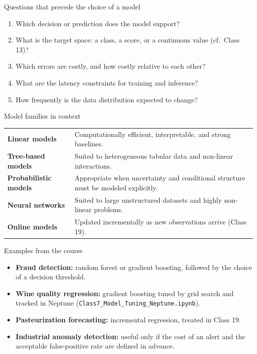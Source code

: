 \begin{frame}{Questions that precede the choice of a model}
\begin{enumerate}
\item Which decision or prediction does the model support?
\item What is the target space: a class, a score, or a continuous value (cf.\ Class 13)?
\item Which errors are costly, and how costly relative to each other?
\item What are the latency constraints for training and inference?
\item How frequently is the data distribution expected to change?
\end{enumerate}
\coursefooter
\end{frame}

\begin{frame}{Model families in context}
\begin{tabularx}{\textwidth}{>{\bfseries}l X}
Linear models & Computationally efficient, interpretable, and strong baselines. \\
\addlinespace[0.3em]
Tree-based models & Suited to heterogeneous tabular data and non-linear interactions. \\
\addlinespace[0.3em]
Probabilistic models & Appropriate when uncertainty and conditional structure must be modeled explicitly. \\
\addlinespace[0.3em]
Neural networks & Suited to large unstructured datasets and highly non-linear problems. \\
\addlinespace[0.3em]
Online models & Updated incrementally as new observations arrive (Class 19). \\
\bottomrule
\end{tabularx}
\coursefooter
\end{frame}

\begin{frame}{Examples from the course}
\begin{itemize}
\item \textbf{Fraud detection:} random forest or gradient boosting, followed by the choice of a decision threshold.
\item \textbf{Wine quality regression:} gradient boosting tuned by grid search and tracked in Neptune (\texttt{Class7\_Model\_Tuning\_Neptune.ipynb}).
\item \textbf{Pasteurization forecasting:} incremental regression, treated in Class 19.
\item \textbf{Industrial anomaly detection:} useful only if the cost of an alert and the acceptable false-positive rate are defined in advance.
\end{itemize}
\coursefooter
\end{frame}

